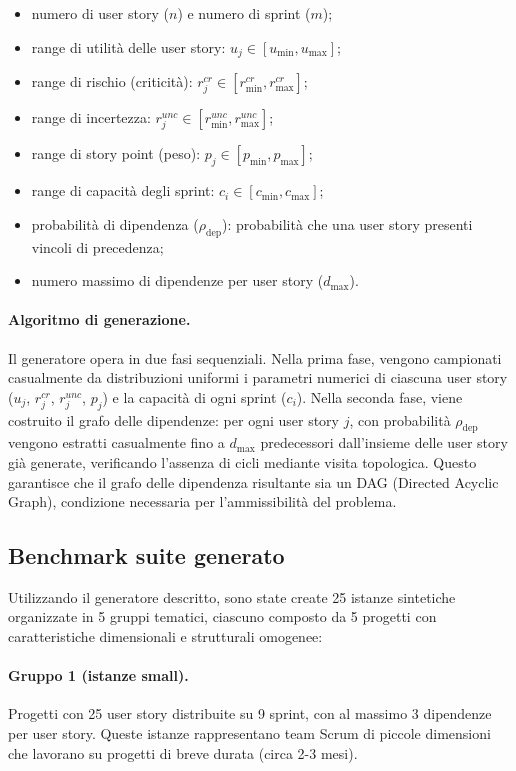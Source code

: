 \documentclass[12pt,a4paper,openright,twoside]{book}
\begin{document}
\begin{itemize}
    \item numero di user story ($n$) e numero di sprint ($m$);
    \item range di utilità delle user story: $u_j \in [u_{\min}, u_{\max}]$;
    \item range di rischio (criticità): $r_j^{cr} \in [r_{\min}^{cr}, r_{\max}^{cr}]$;
    \item range di incertezza: $r_j^{unc} \in [r_{\min}^{unc}, r_{\max}^{unc}]$;
    \item range di story point (peso): $p_j \in [p_{\min}, p_{\max}]$;
    \item range di capacità degli sprint: $c_i \in [c_{\min}, c_{\max}]$;
    \item probabilità di dipendenza ($\rho_{\text{dep}}$): probabilità che una user story presenti vincoli di precedenza;
    \item numero massimo di dipendenze per user story ($d_{\max}$).
\end{itemize}

\paragraph{Algoritmo di generazione.}
Il generatore opera in due fasi sequenziali. Nella prima fase, vengono campionati casualmente da distribuzioni uniformi i parametri numerici di ciascuna user story ($u_j$, $r_j^{cr}$, $r_j^{unc}$, $p_j$) e la capacità di ogni sprint ($c_i$). Nella seconda fase, viene costruito il grafo delle dipendenze: per ogni user story $j$, con probabilità $\rho_{\text{dep}}$ vengono estratti casualmente fino a $d_{\max}$ predecessori dall'insieme delle user story già generate, verificando l'assenza di cicli mediante visita topologica. Questo garantisce che il grafo delle dipendenza risultante sia un DAG (Directed Acyclic Graph), condizione necessaria per l'ammissibilità del problema.

\subsection{Benchmark suite generato}

Utilizzando il generatore descritto, sono state create 25 istanze sintetiche organizzate in 5 gruppi tematici, ciascuno composto da 5 progetti con caratteristiche dimensionali e strutturali omogenee:

\paragraph{Gruppo 1 (istanze small).} 
Progetti con 25 user story distribuite su 9 sprint, con al massimo 3 dipendenze per user story. Queste istanze rappresentano team Scrum di piccole dimensioni che lavorano su progetti di breve durata (circa 2-3 mesi).
\end{document}

